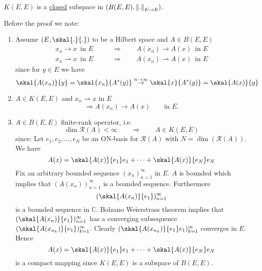 \begin{proposition}
	$K(E,E)$ is a \underline{closed} subspace in $(B(E,E), \norm{.}_{E \to E})$.
\end{proposition}
Before the proof we note:
\begin{enumerate}
	\item Assume $(E,\skal{.}{.})$ to be a Hilbert space and $A \in B(E,E)$
	\begin{align*}
		x_n \to x \,\text{ in }E \qquad &\Rightarrow \qquad A(x_n) \to A(x)\, \text{ in }E \\
		x_n \rightharpoonup x \,\text{ in }E \qquad &\Rightarrow \qquad A(x_n) \rightharpoonup A(x)\, \text{ in }E
	\end{align*}
	since for $y \in E$ we have
	\[
		\skal{A(x_n)}{y} = \skal{x_n}{A^*(y)} \stackrel{n \to \infty}{\to } \skal{x}{A^*(y)} = \skal{A(x)}{y}
	\]
	\item $A \in K(E,E)$ and $x_n \rightharpoonup x$ in $E$ 
	\[
		\Rightarrow A(x_n) \to A(x) \qquad \text{in }E.
	\]
	\item $A \in B(E,E)$ finite-rank operator, i.e.
	\[
		\dim \mathcal{R}(A) < \infty \qquad \Rightarrow \qquad A \in K(E,E)
	\]
	since: Let $e_1,e_2, \dots, e_N$ be an ON-basis for $\mathcal{R}(A)$ with $N = \dim( \mathcal{R}(A))$. We have
	\[
		A(x) = \skal{A(x)}{e_1}e_1 + \dots + \skal{A(x)}{e_N}e_N
	\]
	Fix an arbitrary bounded sequence $(x_n)_{n=1}^{\infty}$ in $E$. $A$ is bounded which implies that $(A(x_n))_{n=1}^{\infty}$ is a bounded sequence. Furthermore
	\[
		(\skal{A(x_n)}{e_1})_{n=1}^{\infty}
	\]
	is a bounded sequence in $\mathbb{C}$. Bolzano Weierstrass theorem implies that $(\skal{A(x_n)}{e_1})_{n=1}^{\infty}$ has a converging subsequence 
	$(\skal{A(x _{n_k})}{e_1})_{k=1}^{\infty}$. Clearly $(\skal{A(x _{n_k})}{e_1} e_1)_{k=1}^{\infty}$ converges in $E$. \\
	Hence 
	\[
		A(x) = \skal{A(x)}{e_1}e_1 + \dots + \skal{A(x)}{e_N}e_N
	\]
	is a compact mapping since $K(E,E)$ is a subspace of $B(E,E)$.
\end{enumerate}

